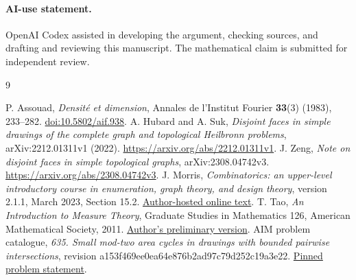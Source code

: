 \documentclass[11pt]{article}
\begin{document}
\paragraph{AI-use statement.}
OpenAI Codex assisted in developing the argument, checking sources, and drafting and reviewing this manuscript. The mathematical claim is submitted for independent review.

\begin{thebibliography}{9}
\raggedright
{} P. Assouad, \emph{Densit\'e et dimension}, Annales de l'Institut Fourier \textbf{33}(3) (1983), 233--282. \href{https://doi.org/10.5802/aif.938}{doi:10.5802/aif.938}.
 A. Hubard and A. Suk, \emph{Disjoint faces in simple drawings of the complete graph and topological Heilbronn problems}, arXiv:2212.01311v1 (2022). \url{https://arxiv.org/abs/2212.01311v1}.
 J. Zeng, \emph{Note on disjoint faces in simple topological graphs}, arXiv:2308.04742v3. \url{https://arxiv.org/abs/2308.04742v3}.
 J. Morris, \emph{Combinatorics: an upper-level introductory course in enumeration, graph theory, and design theory}, version 2.1.1, March 2023, Section 15.2. \href{https://www.cs.uleth.ca/~morris/Combinatorics/html/sect_planar-EulerFla.html}{Author-hosted online text}.
 T. Tao, \emph{An Introduction to Measure Theory}, Graduate Studies in Mathematics 126, American Mathematical Society, 2011. \href{https://terrytao.wordpress.com/books/an-introduction-to-measure-theory/}{Author's preliminary version}.
 AIM problem catalogue, \emph{635. Small mod-two area cycles in drawings with bounded pairwise intersections}, revision a153f469ee0ea64e876b2ad97c79d252c19a3e22. \href{https://github.com/MColbrook/AIM/blob/a153f469ee0ea64e876b2ad97c79d252c19a3e22/problems/635-bounded-crossing-heilbronn.md}{Pinned problem statement}.
\end{thebibliography}
\end{document}
